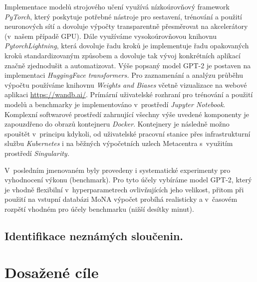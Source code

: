\documentclass[a4paper,11pt]{article}
\begin{document}
Implementace modelů strojového učení využívá nízkoúrovňový framework \emph{PyTorch}, který poskytuje
potřebné nástroje pro sestavení, trénování a použití neuronových sítí a dovoluje výpočty transparentně
přesměrovat na akcelerátory (v~našem případě GPU).
Dále využíváme vysokoúrovňovou knihovnu \emph{PytorchLightning}, která dovoluje řadu kroků
je implementuje řadu opakovaných kroků standardizovaným způsobem a dovoluje tak vývoj konkrétních aplikací
značně zjednodušit a automatizovat.
Výše popsaný model GPT-2 je postaven na implementaci \emph{HuggingFace transformers.}
Pro zaznamenání a analýzu průběhu výpočtu používáme knihovnu \emph{Weights and Biases} včetně vizualizace na webové aplikaci
\url{https://wandb.ai/}.
Prímární uživatelské rozhraní pro trénování a použití modelů a benchmarky je implementováno v~prostředí
\emph{Jupyter Notebook}.
Komplexní softwarové prostředí zahrnující všechny výše uvedené komponenty je zapouzdřeno do
obrazů kontejneru \emph{Docker}.
Kontejnery je následně možno spouštět v~principu kdykoli, od uživatelské pracovní stanice přes
infrastrukturní službu \emph{Kubernetes} i na běžných výpočetních uzlech Metacentra s~využitím 
prostředí \emph{Singularity.} 

V~posledním jmenovaném byly provedeny i systematické experimenty pro vyhodnocení výkonu (benchmark).
Pro tyto účely vybíráme model GPT-2, který je vhodně flexibilní v~hyperparametrech ovlivňujících jeho velikost,
přitom při použití na vstupní databázi MoNA výpočet probíhá realisticky a v~časovém rozpětí vhodném
pro účely benchmarku (nižší desítky minut).



\subsection{Identifikace neznámých sloučenin.}












\section{Dosažené cíle}
\label{cile}
\end{document}
